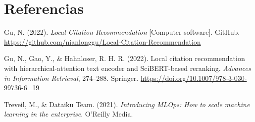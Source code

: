 \documentclass[9pt]{article}
\begin{document}

\section*{Referencias}

\scriptsize

Gu, N. (2022).
\textit{Local-Citation-Recommendation} [Computer software].
GitHub.
\url{https://github.com/nianlonggu/Local-Citation-Recommendation}

Gu, N., Gao, Y., \& Hahnloser, R. H. R. (2022).
Local citation recommendation with hierarchical-attention text encoder and
SciBERT-based reranking.
\textit{Advances in Information Retrieval}, 274--288.
Springer.
\url{https://doi.org/10.1007/978-3-030-99736-6_19}

Treveil, M., \& Dataiku Team. (2021).
\textit{Introducing MLOps: How to scale machine learning in the enterprise}.
O'Reilly Media.
\end{document}
